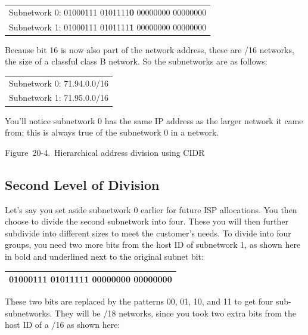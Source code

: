 \documentclass[b5paper,11pt]{memoir}
\begin{document}
\begin{longtable}[]{@{}l@{}}
\toprule
\endhead
Subnetwork 0: 01000111 0101111{\textbf{0}} 00000000
00000000\tabularnewline
Subnetwork 1: 01000111 0101111{\textbf{1}} 00000000
00000000\tabularnewline
\bottomrule
\end{longtable}

Because bit 16 is now also part of the network address, these are /16
networks, the size of a classful class B network. So the subnetworks are
as follows:

\begin{longtable}[]{@{}l@{}}
\toprule
\endhead
Subnetwork 0: 71.94.0.0/16\tabularnewline
Subnetwork 1: 71.95.0.0/16\tabularnewline
\bottomrule
\end{longtable}

You'll notice subnetwork 0 has the same IP address as the larger network
it came from; this is always true of the subnetwork 0 in a network.

\protect\hypertarget{ch20s04.htmlux5cux23hierarchical_address_division_using_cidr}{}{}

\protect\hypertarget{ch20s04.htmlux5cux23I_mediaobject6_d1e22510}{}{}

Figure~20-4.~Hierarchical address division using CIDR

\subsection[Second Level of
Division]{\texorpdfstring{\protect\hypertarget{ch20s04.htmlux5cux23second_level_of_division}{}{}Second
Level of Division}{Second Level of Division}}

Let's say you set aside subnetwork 0 earlier for future ISP allocations.
You then choose to divide the second subnetwork into four. These you
will then further subdivide into different sizes to meet the customer's
needs. To divide into four groups, you need two more bits from the host
ID of subnetwork 1, as shown here in bold and underlined next to the
original subnet bit:

\begin{longtable}[]{@{}l@{}}
\toprule
\endhead
01000111 0101111{\textbf{1 {00}}}000000 00000000\tabularnewline
\bottomrule
\end{longtable}

These two bits are replaced by the patterns 00, 01, 10, and 11 to get
four sub-subnetworks. They will be /18 networks, since you took two
extra bits from the host ID of a /16 as shown here:
\end{document}
